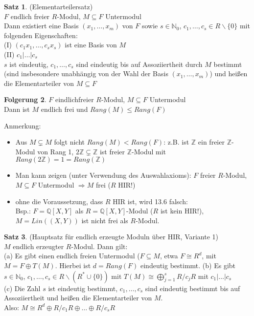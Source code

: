 \documentclass[10pt,a4paper,numbers=endperiod]{scrartcl}
\theoremstyle{definition}
\newtheorem{satz}{Satz}[section]
\newtheorem{folg}[satz]{Folgerung}
\def\QQ{{\mathbb Q}}
\def\NN{{\mathbb N}}
\def\ZZ{{\mathbb Z}}
\begin{document}
\begin{satz}
	(Elementarteilersatz)\\
	$F$ endlich freier $R$-Modul, $M \subseteq F$ Untermodul\\
	Dann existiert eine Basis $(x_1, \ldots, x_m)$ von $F$ sowie $s \in \NN_0$, $c_1, \ldots, c_s \in R \backslash \{0\}$ mit folgenden Eigenschaften:\\
	(I) $(c_1x_1, \ldots, c_sx_s)$ ist eine Basis von $M$\\
	(II) $c_1|\ldots|c_s$\\
	$s$ ist eindeutig, $c_1, \ldots, c_s$ sind eindeutig bis auf Assoziiertheit durch $M$ bestimmt (sind insbesondere unabhängig von der Wahl der Basis $(x_1, \ldots, x_m)$) und heißen die Elementarteiler von $M \subseteq F$
\end{satz}

\begin{folg}
	$F$ eindlichfreier $R$-Modul, $M \subseteq F$ Untermodul\\
	Dann ist $M$ endlich frei und $Rang(M) \leq Rang(F)$
\end{folg}

Anmerkung:
\begin{itemize}
	\item Aus $M \subsetneq M$ folgt nicht $Rang(M) < Rang(F)$: z.B. ist $\ZZ$ ein freier $\ZZ$-Modul von Rang 1, $2\ZZ \subsetneq \ZZ$ ist freier $\ZZ$-Modul mit $Rang(2\ZZ) = 1 = Rang(\ZZ)$
	\item Man kann zeigen (unter Verwendung des Auswahlaxioms): $F$ freier $R$-Modul, $M \subseteq F$ Untermodul $\Rightarrow M$ frei ($R$ HIR!)
	\item ohne die Voraussetzung, dass $R$ HIR ist, wird 13.6 falsch:\\
	Bsp.: $F = \QQ[X,Y]$ als $R = \QQ[X, Y]$-Modul ($R$ ist kein HIR!), $M = Lin((X,Y))$ ist nicht frei als $R$-Modul.
\end{itemize}
\begin{satz}
	(Hauptsatz für endlich erzeugte Moduln über HIR, Variante 1)\\
	$M$ endlich erzeugter $R$-Modul. Dann gilt:\\
	(a) Es gibt einen endlich freien Untermodul ($F \subseteq M$, etwa $F \cong R^d$, mit $M = F \oplus T(M)$. Hierbei ist $d = Rang(F)$ eindeutig bestimmt.
	(b) Es gibt $s \in \NN_0$, $c_1, \ldots, c_s \in R \backslash (R^* \cup \{0\})$ mit $T(M) \cong \bigoplus\limits_{j = 1}^s R/c_jR$ mit $c_1|\ldots|c_s$\\
	(c) Die Zahl $s$ ist eindeutig bestimmt, $c_1, \ldots, c_s$ sind eindeutig bestimmt bis auf Assoziiertheit und heißen die Elementarteiler von $M$.\\
	Also: $M \cong R^d \oplus R/c_1R \oplus \ldots \oplus R/c_sR$
\end{satz}
\end{document}
